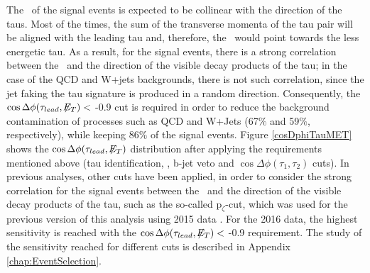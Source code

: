  \noindent The \METv~of the signal events is expected to be collinear with 
 the direction of the taus. Most of the times, the sum of the transverse momenta of the tau pair 
 will be aligned with the leading tau and, therefore, the \METv~would
 point towards the less energetic tau. As a result, for the signal events, 
 there is a strong correlation between the \METv~and the direction of the visible 
 decay products of the tau; in the case of the QCD and W+jets backgrounds, there is 
 not such correlation, since the jet faking the tau signature is produced 
 in a random direction. Consequently, the $\cos\Delta \phi (\tau_{lead},\not\!\!E_T) <$ -0.9 cut is 
 required in order to reduce the background contamination of processes such as 
 QCD and W+Jets (67$\%$ and 59$\%$, respectively), while keeping 86$\%$ of the 
 signal events. Figure \ref{cosDphiTauMET} shows the $\cos\Delta \phi (\tau_{lead},\not\!\!E_T)$
 distribution after applying the requirements mentioned above (tau identification, \MET, b-jet veto
 and $\cos\Delta \phi (\tau_{1},\tau_{2})$ cuts). In previous analyses, other cuts have 
 been applied, in order to consider the strong correlation for the signal events between the \METv~and the 
 direction of the visible decay products of the tau, such as the so-called 
 p$_{\zeta}$-cut, which was used for the previous version of this analysis
 using 2015 data \cite{CMSZprimetotautau2015}. For the 2016 data, the highest sensitivity
 is reached with the $\cos\Delta \phi (\tau_{lead},\not\!\!E_T) <$ -0.9 requirement. The 
 study of the sensitivity reached for different cuts is described in Appendix \ref{chap:EventSelection}.
    
%  
%  
 
